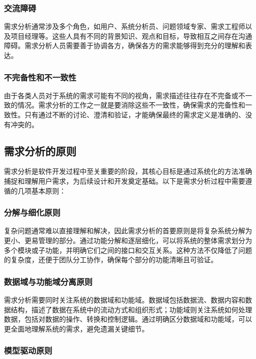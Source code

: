 \subsubsection{交流障碍}

需求分析通常涉及多个角色，如用户、系统分析员、问题领域专家、需求工程师以及项目经理等。这些人具有不同的背景知识、观点和目标，导致相互之间存在沟通障碍。需求分析人员需要善于协调各方，确保各方的需求能够得到充分的理解和表达。

\subsubsection{不完备性和不一致性}

由于各类人员对于系统的需求可能有不同的视角，需求描述往往存在不完备或不一致的情况。需求分析的工作之一就是要消除这些不一致性，确保需求的完备性和一致性。只有通过不断的讨论、澄清和验证，才能确保最终的需求定义是准确的、没有冲突的。

\subsection{需求分析的原则}

需求分析是软件开发过程中至关重要的阶段，其核心目标是通过系统化的方法准确捕捉和理解用户需求，为后续设计和开发奠定基础。以下是需求分析过程中需要遵循的几项基本原则：

\subsubsection{分解与细化原则}

复杂问题通常难以直接理解和解决，因此需求分析的首要原则是将复杂系统分解为更小、更易管理的部分。通过功能分解和逐层细化，可以将系统的整体需求划分为多个模块或子功能，并明确它们之间的接口和交互关系。这种方法不仅降低了问题的复杂度，还便于团队分工协作，确保每个部分的功能清晰且可验证。

\subsubsection{数据域与功能域分离原则}

需求分析需要同时关注系统的数据域和功能域。数据域包括数据流、数据内容和数据结构，描述了数据在系统中的流动方式和组织形式；功能域则关注系统如何处理数据，包括对数据的操作、转换和控制逻辑。通过明确区分数据域和功能域，可以更全面地理解系统的需求，避免遗漏关键细节。

\subsubsection{模型驱动原则}


